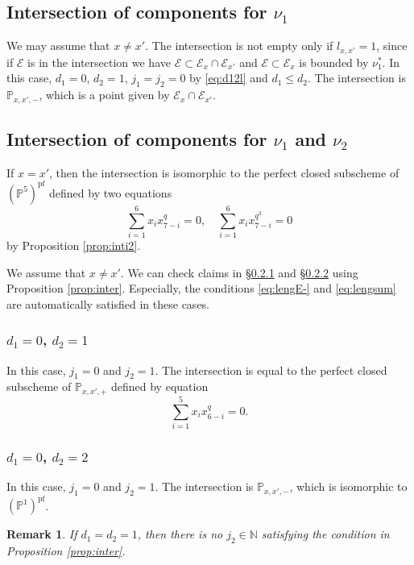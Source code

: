\documentclass[12pt,a4paper]{article}
\newtheorem{rem}[thm]{Remark}
\newcommand{\bN}{\mathbb{N}}
\newcommand{\bP}{\mathbb{P}}
\newcommand{\cE}{\mathcal{E}}
\begin{document}
\subsection{Intersection of components for $\nu_1$}
We may assume that $x \neq x'$. 
The intersection is not empty only if 
$l_{x,x'}=1$, since if $\cE$ is in the intersection we have $\cE \subset \cE_x \cap \cE_{x'}$ and $\cE \subset \cE_x$ is bounded by $\nu_1^*$. 
In this case, $d_1=0$, $d_2=1$, $j_1=j_2=0$ by \eqref{eq:d12l} and $d_1 \leq d_2$. 
The intersection is $\bP_{x,x',-}$, which is a point given by 
$\cE_x \cap \cE_{x'}$. 

\subsection{Intersection of components for $\nu_1$ and $\nu_2$}
If $x=x'$, then the intersection is 
isomorphic to the perfect closed subscheme of $(\bP^5)^{\mathrm{pf}}$ defined by two equations 
\[
 \sum_{i=1}^6 x_i x_{7-i}^q=0, \quad 
 \sum_{i=1}^6 x_i x_{7-i}^{q^3}=0 
\]
by Proposition \ref{prop:inti2}. 

We assume that $x\neq x'$. 
We can check claims in \S \ref{sssec:d01} and \S \ref{sssec:d02} using Proposition \ref{prop:inter}. Especially, the conditions \eqref{eq:lengE-} and \eqref{eq:lengsum} are automatically satisfied in these cases. 

\subsubsection{$d_1=0$, $d_2=1$}\label{sssec:d01}
In this case, $j_1=0$ and $j_2=1$. 
The intersection is equal to 
the perfect closed subscheme of $\bP_{x,x',+}$ defined by equation 
\[
 \sum_{i=1}^5 x_i x_{6-i}^q=0.  
\]

\subsubsection{$d_1=0$, $d_2=2$}\label{sssec:d02}
In this case, $j_1=0$ and $j_2=1$. 
The intersection is 
$\bP_{x,x',-}$, which is isomorphic to 
$(\bP^1)^{\mathrm{pf}}$. 

\begin{rem}
If $d_1=d_2=1$, then there is no $j_2 \in \bN$ satisfying the condition in Proposition 
\ref{prop:inter}. 
\end{rem}
\end{document}
